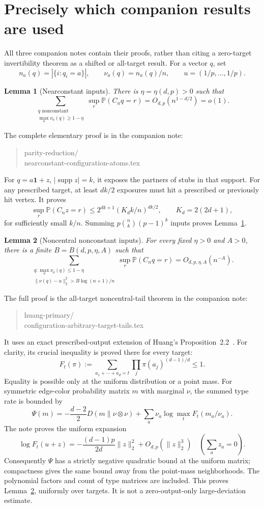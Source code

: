 \documentclass[11pt]{article}
\newtheorem{lemma}{Lemma}
\newcommand{\one}{\mathbf1}
\newcommand{\Prob}{\mathbb P}
\begin{document}
\section{Precisely which companion results are used}
All three companion notes contain their proofs, rather than citing
a zero-target invertibility theorem as a shifted or all-target result.
For a vector $q$, set
\[
 n_a(q)=|\{i:q_i=a\}|,\qquad \nu_a(q)=n_a(q)/n,
 \qquad u=(1/p,\ldots,1/p).
\]

\begin{lemma}[Nearconstant inputs]\label{lem:near}
There is $\eta=\eta(d,p)>0$ such that
\[
 \sum_{\substack{q\text{ nonconstant}\\
             \max_a\nu_a(q)\ge1-\eta}}
       \sup_r\Prob(C_nq=r)=O_{d,p}(n^{1-d/2})=o(1).
\]
\end{lemma}
The complete elementary proof is in the companion note:
\begin{quote}\small\ttfamily
parity-reduction/\\
nearconstant-configuration-atoms.tex
\end{quote}
For $q=a\one+z$, $|\operatorname{supp}z|=k$, it exposes the partners
of stubs in that support. For any prescribed target, at least $dk/2$
exposures must hit a prescribed or previously hit vertex. It proves
\[
 \sup_r\Prob(C_nz=r)
 \le2^{dk+1}(K_d k/n)^{dk/2},\qquad K_d=2(2d+1),
\]
for sufficiently small $k/n$. Summing
$p\binom nk(p-1)^k$ inputs proves Lemma~\ref{lem:near}.

\begin{lemma}[Noncentral nonconstant inputs]\label{lem:middle}
For every fixed $\eta>0$ and $A>0$, there is a finite
$B=B(d,p,\eta,A)$ such that
\[
 \sum_{\substack{q:\max_a\nu_a(q)\le1-\eta\\
                \|\nu(q)-u\|_2^2>B\log(n+1)/n}}
       \sup_r\Prob(C_nq=r)=O_{d,p,\eta,A}(n^{-A}).
\]
\end{lemma}
The full proof is the all-target noncentral-tail theorem in the companion note:
\begin{quote}\small\ttfamily
huang-primary/\\
configuration-arbitrary-target-tails.tex
\end{quote}
It uses an exact prescribed-output extension of Huang's
Proposition~2.2~\cite{Huang}. For clarity, its crucial inequality is
proved there for every target:
\[
 F_t(\pi):=\sum_{a_1+\cdots+a_d=t}
          \prod_j\pi(a_j)^{(d-1)/d}\le1.
\]
Equality is possible only at the uniform distribution or a point mass.
For symmetric edge-color probability matrix $m$ with marginal $\nu$,
the summed type rate is bounded by
\[
 \Psi(m)=-\frac{d-2}{2}D(m\|\nu\otimes\nu)
         +\sum_a\nu_a\log\max_tF_t(m_a/\nu_a).
\]
The note proves the uniform expansion
\[
 \log F_t(u+z)=-\frac{(d-1)p}{2d}\|z\|_2^2+O_{d,p}(\|z\|_2^3)
 \quad\left(\sum_a z_a=0\right).
\]
Consequently $\Psi$ has a strictly negative quadratic bound at the
uniform matrix; compactness gives the same bound away from the
point-mass neighborhoods. The polynomial factors and count of type
matrices are included. This proves Lemma~\ref{lem:middle}, uniformly
over targets. It is not a zero-output-only large-deviation estimate.
\end{document}
